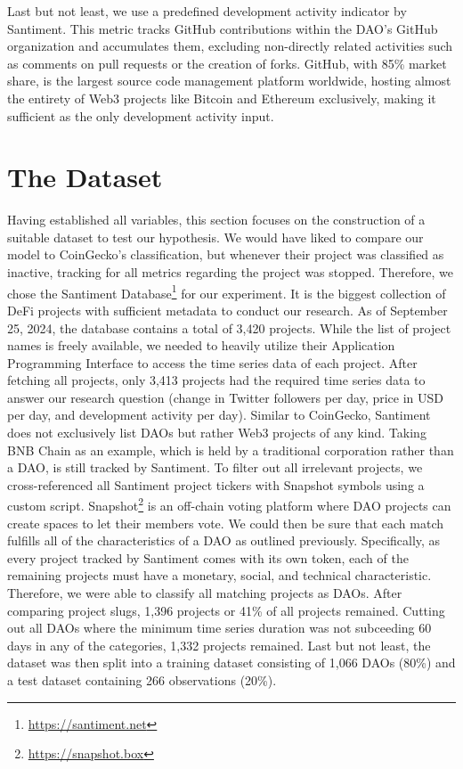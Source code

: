 Last but not least, we use a predefined development activity indicator by Santiment. This metric tracks GitHub contributions within the DAO's GitHub organization and accumulates them, excluding non-directly related activities such as comments on pull requests or the creation of forks. GitHub, with 85\% market share, is the largest source code management platform worldwide, hosting almost the entirety of Web3 projects like Bitcoin and Ethereum exclusively, making it sufficient as the only development activity input.

\section{The Dataset}
Having established all variables, this section focuses on the construction of a suitable dataset to test our hypothesis.
We would have liked to compare our model to CoinGecko's classification, but whenever their project was classified as inactive, tracking for all metrics regarding the project was stopped.
Therefore, we chose the Santiment Database\footnote{\href{https://santiment.net}{https://santiment.net}} for our experiment. It is the biggest collection of DeFi projects with sufficient metadata to conduct our research. 
As of September 25, 2024, the database contains a total of 3,420 projects. While the list of project names is freely available, we needed to heavily utilize their Application Programming Interface to access the time series data of each project.
After fetching all projects, only 3,413 projects had the required time series data to answer our research question (change in Twitter followers per day, price in USD per day, and development activity per day).
Similar to CoinGecko, Santiment does not exclusively list DAOs but rather Web3 projects of any kind.
Taking BNB Chain as an example, which is held by a traditional corporation rather than a DAO, is still tracked by Santiment.
To filter out all irrelevant projects, we cross-referenced all Santiment project tickers with Snapshot symbols using a custom script.
Snapshot\footnote{\href{https://snapshot.box}{https://snapshot.box}} is an off-chain voting platform where DAO projects can create spaces to let their members vote.
We could then be sure that each match fulfills all of the characteristics of a DAO as outlined previously. Specifically, as every project tracked by Santiment comes with its own token, each of the remaining projects must have a monetary, social, and technical characteristic. Therefore, we were able to classify all matching projects as DAOs.
After comparing project slugs, 1,396 projects or 41\% of all projects remained.
Cutting out all DAOs where the minimum time series duration was not subceeding 60 days in any of the categories, 1,332 projects remained.
Last but not least, the dataset was then split into a training dataset consisting of 1,066 DAOs (80\%) and a test dataset containing 266 observations (20\%).

